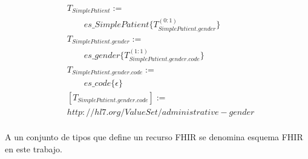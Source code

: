\begin{align*}
&T_{SimplePatient}:= \\
&\qquad es\_SimplePatient\{T_{SimplePatient.gender}^{(0:1)}\} \\
&T_{SimplePatient.gender}:= \\
&\qquad es\_gender\{T_{SimplePatient.gender.code}^{(1:1)}\} \\
&T_{SimplePatient.gender.code}:= \\
&\qquad es\_code\{\epsilon\} \\
&[T_{SimplePatient.gender.code}] := \\
& http://hl7.org/ValueSet/administrative-gender \\
\end{align*}

A un conjunto de tipos que define un recurso FHIR se denomina esquema FHIR en este trabajo.
